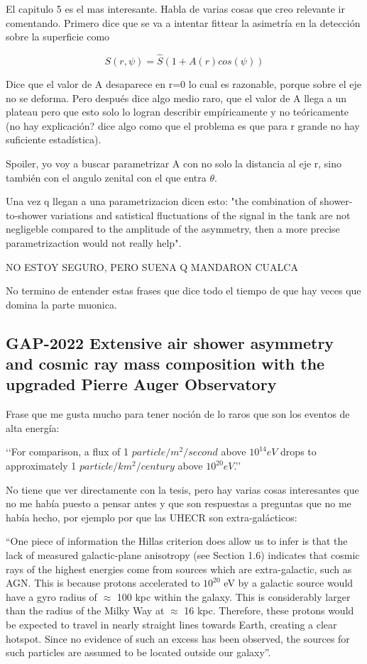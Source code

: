 El capitulo 5 es el mas interesante. Habla de varias cosas que creo relevante ir comentando. Primero dice que se va a intentar fittear la asimetría en la detección sobre la superficie como 

\begin{equation}
    S(r,\psi) = \hat{S} (1 + A(r) cos(\psi))
    \label{eq_de_asimetrias}
\end{equation}

Dice que el valor de A desaparece en r=0 lo cual es razonable, porque  sobre el eje no se deforma. Pero después dice algo medio raro, que el valor de A llega a un plateau pero que esto solo lo logran describir empíricamente y no teóricamente (no hay explicación? dice algo como que el problema es que para r grande no hay suficiente estadística). 

Spoiler, yo voy a buscar parametrizar A con no solo la distancia al eje r, sino también con el angulo zenital con el que entra $\theta$.

Una vez q llegan a una parametrizacion dicen esto: "the combination of shower-to-shower variations and satistical fluctuations of the signal in the tank are not negligeble compared to the amplitude of the asymmetry, then a more precise parametrizaction would not really help".

NO ESTOY SEGURO, PERO SUENA Q MANDARON CUALCA

No termino de entender estas frases que dice todo el tiempo de que hay veces que domina la parte muonica.

\subsection{GAP-2022 Extensive air shower asymmetry and
cosmic ray mass composition with the
upgraded Pierre Auger Observatory\cite{tesis_bradfield}}

Frase que me gusta mucho para tener noción de lo raros que son los eventos de alta energía: 

‘‘For comparison, a flux of 1 $particle/m^2/second$ above $10^{14} eV$ drops to approximately 1 $particle/km^2/century$ above $10^{20} eV$.’’

No tiene que ver directamente con la tesis, pero hay varias cosas interesantes que no me había puesto a pensar antes y que son respuestas a preguntas que no me había hecho, por ejemplo por que las UHECR son extra-galácticos: 

“One piece of information the Hillas criterion does allow us to infer is that the lack of measured galactic-plane anisotropy (see Section 1.6) indicates that cosmic rays of the highest energies come from sources which are extra-galactic, such as AGN. This is because protons accelerated to $10^{20}$ eV by a galactic source would have a gyro radius of $\approx$ 100 kpc within the galaxy. This is considerably larger than the radius of the Milky Way at $\approx$ 16 kpc. Therefore, these protons would be expected to travel in nearly straight lines towards Earth, creating a clear hotspot. Since no evidence of such an excess has been observed, the sources for such particles are assumed to be located outside our galaxy”.

